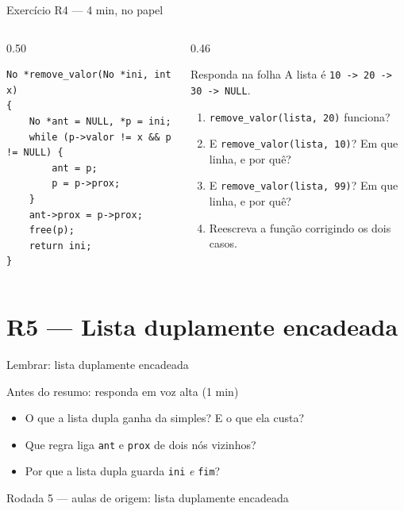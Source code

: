 \documentclass[aspectratio=169]{beamer}
\newcommand{\rodada}[4]{%
  \begin{frame}{Lembrar: #2}
    \begin{block}{Antes do resumo: responda em voz alta (1 min)}
      #4
    \end{block}
    \vfill
    {\small\textcolor{UFSGray}{Rodada #1 --- aulas de origem:} #3}
  \end{frame}}
\begin{document}
\begin{frame}[fragile]{Exercício R4 --- 4 min, no papel}
  \begin{columns}[T]
    \begin{column}{0.50\textwidth}
\begin{lstlisting}[style=numC]
No *remove_valor(No *ini, int x)
{
    No *ant = NULL, *p = ini;
    while (p->valor != x && p != NULL) {
        ant = p;
        p = p->prox;
    }
    ant->prox = p->prox;
    free(p);
    return ini;
}
\end{lstlisting}
    \end{column}
    \begin{column}{0.46\textwidth}
      \begin{block}{Responda na folha}
        \small A lista é \texttt{10 -> 20 -> 30 -> NULL}.
        \begin{enumerate}
          \item[(a)] \texttt{remove\_valor(lista, 20)} funciona?
          \item[(b)] E \texttt{remove\_valor(lista, 10)}? Em que linha,
            e por quê?
          \item[(c)] E \texttt{remove\_valor(lista, 99)}? Em que linha,
            e por quê?
          \item[(d)] Reescreva a função corrigindo os dois casos.
        \end{enumerate}
      \end{block}
    \end{column}
  \end{columns}
\end{frame}

\section{R5 --- Lista duplamente encadeada}

\rodada{5}{lista duplamente encadeada}{lista duplamente encadeada}{
  \begin{itemize}
    \item O que a lista dupla ganha da simples? E o que ela custa?
    \item Que regra liga \texttt{ant} e \texttt{prox} de dois nós vizinhos?
    \item Por que a lista dupla guarda \texttt{ini} \emph{e} \texttt{fim}?
  \end{itemize}}
\end{document}
